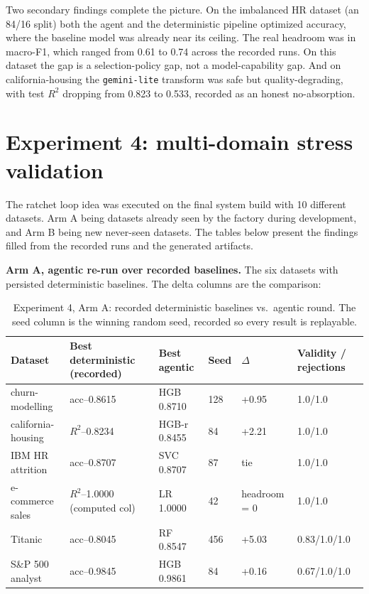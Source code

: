 Two secondary findings complete the picture. On the imbalanced HR dataset (an 84/16 split) both the agent and the deterministic pipeline optimized accuracy, where the baseline model was already near its ceiling. The real headroom was in macro-F1, which ranged from 0.61 to 0.74 across the recorded runs. On this dataset the gap is a selection-policy gap, not a model-capability gap. And on california-housing the \texttt{gemini-lite} transform was safe but quality-degrading, with test $R^2$ dropping from 0.823 to 0.533, recorded as an honest no-absorption.

\section{Experiment 4: multi-domain stress validation}
\label{sec:exp-kaggle-results}

The ratchet loop idea was executed on the final system build with 10 different datasets. Arm A being datasets already seen by the factory during development, and Arm B being new never-seen datasets. The tables below present the findings filled from the recorded runs and the generated artifacts.

\textbf{Arm A, agentic re-run over recorded baselines.} The six datasets with persisted deterministic baselines. The delta columns are the comparison:


\begin{table}[H]
\centering
\caption{Experiment 4, Arm A: recorded deterministic baselines vs.\ agentic round. The seed column is the winning random seed, recorded so every result is replayable.}
\label{tab:exp4arma}
\small
\begin{tabular}{p{3.0cm}p{2.4cm}p{2.4cm}p{1.2cm}p{1.4cm}p{2.2cm}}
\toprule
\textbf{Dataset} & \textbf{Best deterministic (recorded)} & \textbf{Best agentic} & \textbf{Seed} & \textbf{$\Delta$} & \textbf{Validity / rejections} \\
\midrule
churn-modelling & acc--0.8615 & HGB 0.8710 & 128 & +0.95 & 1.0/1.0 \\
california-housing & $R^2$--0.8234 & HGB-r 0.8455 & 84 & +2.21 & 1.0/1.0 \\
IBM HR attrition & acc--0.8707 & SVC 0.8707 & 87 & tie & 1.0/1.0 \\
e-commerce sales & $R^2$--1.0000 (computed col) & LR 1.0000 & 42 & headroom = 0 & 1.0/1.0 \\
Titanic & acc--0.8045 & RF 0.8547 & 456 & +5.03 & 0.83/1.0/1.0 \\
S\&P 500 analyst & acc--0.9845 & HGB 0.9861 & 84 & +0.16 & 0.67/1.0/1.0 \\
\bottomrule
\end{tabular}
\end{table}

